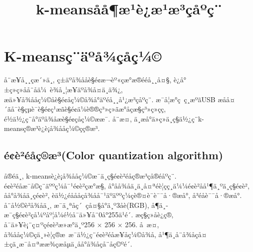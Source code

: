 \documentclass[lang=cn,11pt]{elegantpaper}
\title{k-meansåå¶æ¹è¿æ¹æ³çåºç¨}
\date{}
\begin{document}

\newpage
\maketitle

	
\tableofcontents
\thispagestyle{empty}
\newpage
\normalsize
{}

\section{K-meansç¨äºå¾çåç¼©}
å¨æ¥å¸¸çæ´»ä¸­, ç±äºå¾ååè§é¢æ¬èº«çæ°æ®ééå¸¸å¤§, è¿å°±ç»ç»å­å¨åä¼ è¾å¸¦æ¥äºå¾å¤ä¸ä¾¿, æä»¥å¾ååç¼©åè§é¢åç¼©å¾å°äºéå¸¸å¹¿æ³çåºç¨. æ¯å¦æ°ç ç¸æºãUSB æåå¤´ãå¯è§çµè¯è§é¢ç¹æ­ãè§é¢ä¼è®®ç³»ç»ãæ°å­çæ§ç³»ç»ç­ç­, é½ä½¿ç¨å°äºå¾åæè§é¢çåç¼©ææ¯. å¨æ­¤, ä¸æå°ä»ç»ä¸ç§ä½¿ç¨k-meansç®æ³è¿è¡å¾ååç¼©çç®æ³. 
\subsection{é¢è²éåç®æ³(Color quantization algorithm)}
å®éä¸, k-meansè¿è¡å¾ååç¼©æ¯ä¸ç§é¢è²éåç®æ³çå®éåºç¨. é¢è²éåæ¯å©ç¨äººç¼å¯¹é¢è²çæ°æ§, å°åå¾åä¸­ä¸å¤ªéè¦çç¸ä¼¼é¢è²åå¹¶ä¸ºä¸ç§é¢è², åå°å¾åä¸­çé¢è², èä½¿éåååçå¾åå¯¹äºäººç¼çè®¤è¯è¯¯å·®æå°, å³éåè¯¯å·®æå°. å¨å½©è²å¾åä¸­, æ¯ä¸ªåç´ çå¤§å°ä¸º3å­è(RGB), å¶ä¸­æ¯ç§é¢è²çå¼ºåº¦å¼é½å¯ä»¥å¨0å°255ä¹é´. æç§ç»åè¿ç®, å¯ä»¥è¡¨ç¤ºçé¢è²æ»æ°ä¸º256 $\times$ 256 $\times$ 256. å æ­¤, å¾ååç¼©çä¸»è¦ç®æ æ¯ä½¿ç¨é¢è²éåæ¥åç¼©å¾å, å¹¶ä¸å¨å¾åçå¤±çä¸æ¯å¤ªææ¾çæåµä¸åå°å¾åçå¨å­ç©ºé´. 
\end{document}
